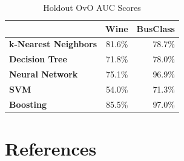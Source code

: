 \documentclass[
	letterpaper, %
]{jdf}
\begin{document}
\begin{table}
\centering
\caption{Holdout OvO AUC Scores}
\begin{tabular}{lrr}
\toprule
{} &  Wine &  BusClass \\
\midrule
\textbf{k-Nearest Neighbors} & 81.6\% &     78.7\% \\
\textbf{Decision Tree      } & 71.8\% &     78.0\% \\
\textbf{Neural Network     } & 75.1\% &     96.9\% \\
\textbf{SVM                } & 54.0\% &     71.3\% \\
\textbf{Boosting           } & 85.5\% &     97.0\% \\
\bottomrule
\end{tabular}
\end{table}

\section{References}
\printbibliography
\end{document}
